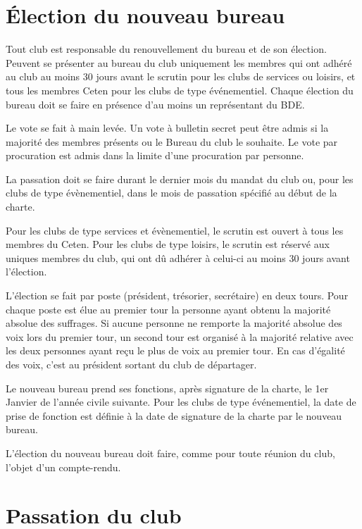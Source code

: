 \documentclass{article}
\begin{document}
\begin{multicols}{2}
		\section{Élection du nouveau bureau}
\label{sec:election_du_nouveau_bureau}

		{\small

			Tout club est responsable du renouvellement du bureau et de son
			élection. Peuvent se présenter au bureau du club uniquement les
			membres qui ont adhéré au club au moins 30 jours avant le scrutin
			pour les clubs de services ou loisirs, et tous les membres Ceten
			pour les clubs de type événementiel. Chaque élection du bureau doit
			se faire en présence d’au moins un représentant du BDE\@.

			Le vote se fait à main levée. Un vote à bulletin secret peut être
			admis si la majorité des membres présents ou le Bureau du club le
			souhaite. Le vote par procuration est admis dans la limite d’une
			procuration par personne.

			La passation doit se faire durant le dernier mois du mandat du club
			ou, pour les clubs de type évènementiel, dans le mois de passation
			spécifié au début de la charte.

			Pour les clubs de type services et évènementiel, le scrutin est
			ouvert à tous les membres du Ceten. Pour les clubs de type loisirs,
			le scrutin est réservé aux uniques membres du club, qui ont dû
			adhérer à celui-ci au moins 30 jours avant l’élection.

			L’élection se fait par poste (président, trésorier, secrétaire) en
			deux tours. Pour chaque poste est élue au premier tour la personne
			ayant obtenu la majorité absolue des suffrages. Si aucune personne
			ne remporte la majorité absolue des voix lors du premier tour, un
			second tour est organisé à la majorité relative avec les deux
			personnes ayant reçu le plus de voix au premier tour. En cas
			d’égalité des voix, c’est au président sortant du club de
			départager.

			Le nouveau bureau prend ses fonctions, après signature de la charte,
			le 1er Janvier de l’année civile suivante. Pour les clubs de type
			événementiel, la date de prise de fonction est 	définie à la date de
			signature de la charte par le nouveau bureau.

			L’élection du nouveau bureau doit faire, comme pour toute réunion du
			club, l’objet d’un compte-rendu.

		}

		\section{Passation du club}
\label{sec:passation_du_club}


\end{multicols}
\end{document}
